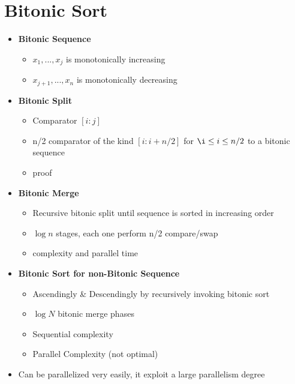 \documentclass[12pt,oneside]{report}
\begin{document}
\section{Bitonic Sort}
\begin{itemize}
    \item \textbf{Bitonic Sequence}
    \begin{itemize}
        \item \(x_1,...,x_j\) is monotonically increasing
        \item \(x_{j+1},...,x_n\) is monotonically decreasing
    \end{itemize}
    \item \textbf{Bitonic Split}
    \begin{itemize}
        \item Comparator \([i:j]\)
        \item n/2 comparator of the kind \([i: i+n/2]\) for \(\i \leq i \leq n/2\) to a bitonic sequence
        \item proof
    \end{itemize}
    \item \textbf{Bitonic Merge}
    \begin{itemize}
        \item Recursive bitonic split until sequence is sorted in increasing order
        \item \(\log n\) stages, each one perform n/2 compare/swap
        \item complexity and parallel time
    \end{itemize}
    \item \textbf{Bitonic Sort for non-Bitonic Sequence}
    \begin{itemize}
        \item Ascendingly \& Descendingly by recursively invoking bitonic sort
        \item \(\log N\) bitonic merge phases
        \item Sequential complexity
        \item Parallel Complexity (not optimal)
    \end{itemize}
    \item Can be parallelized very easily, it exploit a large parallelism degree
\end{itemize}
\end{document}
